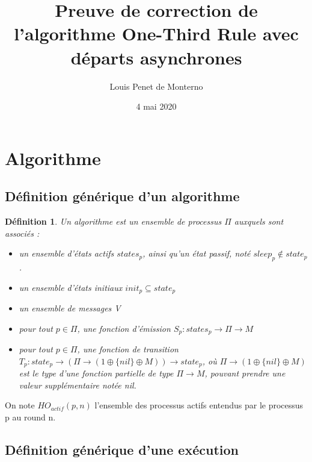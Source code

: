 \documentclass{article}
\title{Preuve de correction de l'algorithme One-Third Rule avec départs asynchrones}
\date{4 mai 2020}
\author{Louis Penet de Monterno}
\newtheorem{definition}{Définition}
\begin{document}
\maketitle
  
\section{Algorithme}

\subsection{Définition générique d'un algorithme}

\begin{definition}

Un algorithme est un ensemble de processus $\Pi$ auxquels sont associés :

\begin{itemize}

  \item un ensemble d'états actifs $states_p$, ainsi qu'un état passif, noté $sleep_p \notin state_p$.
  \item un ensemble d'états initiaux  $init_p \subseteq state_p$
  \item un ensemble de messages V
  \item pour tout $p \in \Pi$, une fonction d'émission
	  $S_p : states_p \rightarrow \Pi \rightarrow M$
  \item pour tout $p \in \Pi$, une fonction de transition
	  $T_p : state_p \rightarrow (\Pi \rightarrow (1 \oplus \{ nil \} \oplus M))
	  \rightarrow state_p$,
	  où $\Pi \rightarrow (1 \oplus \{ nil \} \oplus M)$ est le type d'une fonction partielle
		de type $\Pi \rightarrow M$, pouvant prendre une valeur supplémentaire notée \textit{nil}.

\end{itemize}
\end{definition}

On note $HO_{actif}(p,n)$ l'ensemble des processus actifs entendus par le processus p au round n.

\subsection{Définition générique d'une exécution}
\end{document}
